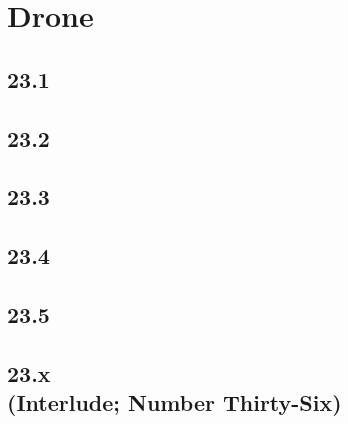 \part{Drone}
 \chapter{23.1}
 \chapter{23.2}
 \chapter{23.3}
 \chapter{23.4}
 \chapter{23.5}
 \chapter[23.x (Interlude; Number Thirty-Six)]{23.x\\(Interlude; Number Thirty-Six)}







